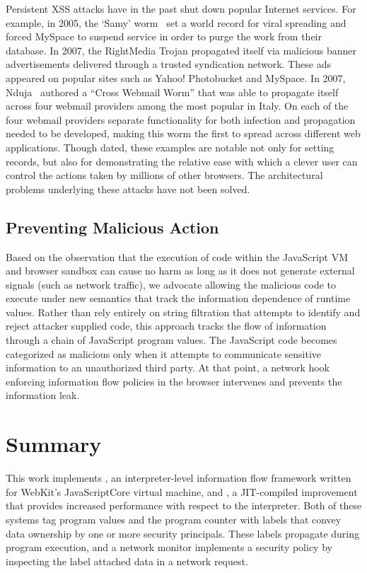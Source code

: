 Persistent XSS attacks have in the past shut down popular Internet services.
For example, in 2005, the `Samy' worm~\cite{samy} set a world record for viral spreading and forced MySpace to suspend service in order to purge the work from their database.
In 2007, the RightMedia Trojan propagated itself via malicious banner advertisements delivered through a trusted syndication network.
These ads appeared on popular sites such as Yahoo! Photobucket and MySpace.
In 2007, Nduja~\cite{nduja} authored a ``Cross Webmail Worm'' that was able to propagate itself across four webmail providers among the most popular in Italy.
On each of the four webmail providers separate functionality for both infection and propagation needed to be developed, making this worm the first to spread across different web applications.
Though dated, these examples are notable not only for setting records, but also for demonstrating the relative ease with which a clever user can control the actions taken by millions of other browsers.
The architectural problems underlying these attacks have not been solved.

\subsection{Preventing Malicious Action}

Based on the observation that the execution of code within the JavaScript VM and browser sandbox can cause no harm as long as it does not generate external signals (such as network traffic), we advocate allowing the malicious code to execute under new semantics that track the information dependence of runtime values.
Rather than rely entirely on string filtration that attempts to identify and reject attacker supplied code, this approach tracks the flow of information through a chain of JavaScript program values.
The JavaScript code becomes categorized as malicious only when it attempts to communicate sensitive information to an unauthorized third party.
At that point, a network hook enforcing information flow policies in the browser intervenes and prevents the information leak.

\section{Summary}

This work implements \FlowCore, an interpreter-level information flow framework written for WebKit's JavaScriptCore virtual machine, and \JitFlow, a JIT-compiled improvement that provides increased performance with respect to the interpreter.
Both of these systems tag program values and the program counter with labels that convey data ownership by one or more security principals.
These labels propagate during program execution, and a network monitor implements a security policy by inspecting the label attached data in a network request.


